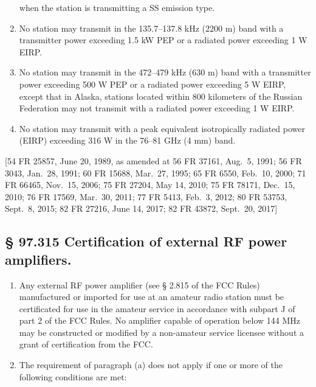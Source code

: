 \documentclass[
  letterpaper,
  DIV=11,
  numbers=noendperiod]{scrreport}
\begin{document}
\begin{enumerate}
  when the station is transmitting a SS emission type.
\item
  No station may transmit in the 135.7--137.8 kHz (2200 m) band with a
  transmitter power exceeding 1.5 kW PEP or a radiated power exceeding 1
  W EIRP.
\item
  No station may transmit in the 472--479 kHz (630 m) band with a
  transmitter power exceeding 500 W PEP or a radiated power exceeding 5
  W EIRP, except that in Alaska, stations located within 800 kilometers
  of the Russian Federation may not transmit with a radiated power
  exceeding 1 W EIRP.
\item
  No station may transmit with a peak equivalent isotropically radiated
  power (EIRP) exceeding 316 W in the 76--81 GHz (4 mm) band.
\end{enumerate}

{[}54 FR 25857, June 20, 1989, as amended at 56 FR 37161, Aug.~5, 1991;
56 FR 3043, Jan.~28, 1991; 60 FR 15688, Mar.~27, 1995; 65 FR 6550,
Feb.~10, 2000; 71 FR 66465, Nov.~15, 2006; 75 FR 27204, May 14, 2010; 75
FR 78171, Dec.~15, 2010; 76 FR 17569, Mar.~30, 2011; 77 FR 5413, Feb.~3,
2012; 80 FR 53753, Sept.~8, 2015; 82 FR 27216, June 14, 2017; 82 FR
43872, Sept.~20, 2017{]}

\hypertarget{certification-of-external-rf-power-amplifiers.}{%
\subsection*{§ 97.315 Certification of external RF power
amplifiers.}\label{certification-of-external-rf-power-amplifiers.}}

\begin{enumerate}
\def\labelenumi{(\alph{enumi})}
\item
  Any external RF power amplifier (see § 2.815 of the FCC Rules)
  manufactured or imported for use at an amateur radio station must be
  certificated for use in the amateur service in accordance with subpart
  J of part 2 of the FCC Rules. No amplifier capable of operation below
  144 MHz may be constructed or modified by a non-amateur service
  licensee without a grant of certification from the FCC.
\item
  The requirement of paragraph (a) does not apply if one or more of the
  following conditions are met:
\end{enumerate}
\end{document}

